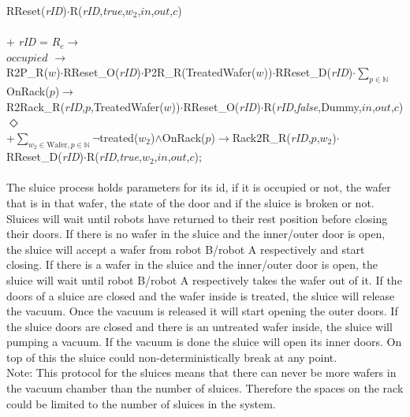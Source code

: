 \documentclass[12pt]{report}
\begin{document}
{	\phantom{-----------------------------} RReset(\emph{rID})$\cdot$R(\emph{rID},\emph{true},$w_2$,$in$,$out$,$c$)\\
	\\
	\phantom{-------} + \emph{rID} = $R_c \rightarrow$\\
	\phantom{----------} $occupied$ $\rightarrow$\\
	\phantom{--------------} R2P\_R($w$)$\cdot$RReset\_O(\emph{rID})$\cdot$P2R\_R(TreatedWafer($w$))$\cdot$RReset\_D(\emph{rID})$\cdot\sum\nolimits_{p \in \mathbb{N}}$OnRack($p$)$\rightarrow$\\
	\phantom{------------------} R2Rack\_R(\emph{rID},$p$,TreatedWafer($w$))$\cdot$RReset\_O(\emph{rID})$\cdot$R(\emph{rID},\emph{false},Dummy,$in$,$out$,$c$)\\
	\phantom{----------} $\Diamond$\\
	\phantom{--------------} +$\sum\nolimits_{w_2 \in \text{Wafer}, p \in \mathbb{N}}\neg$treated($w_2$)$\land$OnRack($p$)$\rightarrow$Rack2R\_R(\emph{rID},$p$,$w_2$)$\cdot$\\
	\phantom{-----------------------------} RReset\_D(\emph{rID})$\cdot$R(\emph{rID},\emph{true},$w_2$,$in$,$out$,$c$);
	}\\
	\\
	The sluice process holds parameters for its id, if it is occupied or not, the wafer that is in that wafer, the state of the door and if the sluice is broken or not. Sluices will wait until robots have returned to their rest position before closing their doors. If there is no wafer in the sluice and the inner/outer door is open, the sluice will accept a wafer from robot B/robot A respectively and start closing. If there is a wafer in the sluice and the inner/outer door is open, the sluice will wait until robot B/robot A respectively takes the wafer out of it. If the doors of a sluice are closed and the wafer inside is treated, the sluice will release the vacuum. Once the vacuum is released it will start opening the outer doors. If the sluice doors are closed and there is an untreated wafer inside, the sluice will pumping a vacuum. If the vacuum is done the sluice will open its inner doors. On top of this the sluice could non-deterministically break at any point.\\
	Note: This protocol for the sluices means that there can never be more wafers in the vacuum chamber than the number of sluices. Therefore the spaces on the rack could be limited to the number of sluices in the system.\\
\end{document}
